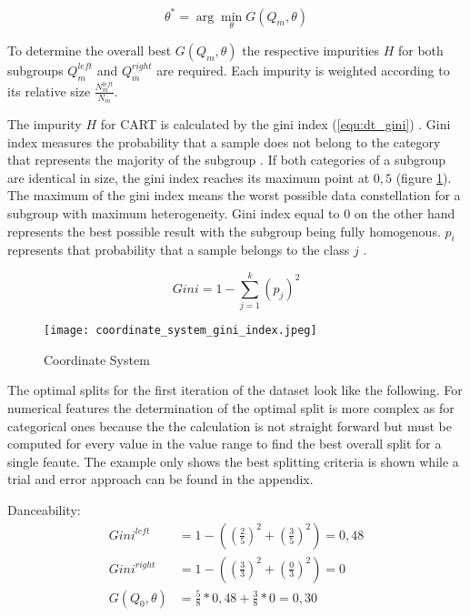 \begin{equation}
    \theta ^* = \arg \min_{\theta}  G(Q_{m}, \theta)
    \label{equ:dt_min_gain}
\end{equation}

To determine the overall best \(G(Q_{m}, \theta)\) the respective impurities \(H\) for both subgroups \(Q^{left}_{m}\) 
and \(Q^{right}_{m}\) are required. Each impurity is weighted according to its relative size 
\(\frac{N^{left}_{m}}{N_{m}}\).

The impurity \(H\) for \ac{CART} is calculated by the gini index (\ref{equ:dt_gini}) \cite[p.613f]{tangirala2020evaluating}. Gini index measures the probability that a sample 
does not belong to the category that represents the majority of the subgroup \cite[p.335]{James2021}. If both 
categories of a subgroup are identical in size, the gini index reaches its maximum point at \(0,5\) (figure \ref{fig:coordinate_system_initial_dataset}). The 
maximum of the gini index means the worst possible data constellation for a subgroup with maximum heterogeneity. 
Gini index equal to \(0\) on the other hand represents the best possible result with the subgroup being fully 
homogenous. \(p_{i}\) represents that probability that a sample belongs to the class \(j\) \cite[p.335]{James2021}.

\begin{equation}
    Gini = 1 - \sum ^k_{j = 1}(p_{j})^2
    \label{equ:dt_gini}
\end{equation}

\begin{figure}[H]
    \centering
    \caption[]{Coordinate System}
	\label{fig:coordinate_system_initial_dataset}
    \texttt{[image: coordinate\_system\_gini\_index.jpeg]}
\end{figure}

The optimal splits for the first iteration of the dataset look like the following. For numerical features the determination of 
the optimal split is more complex as for categorical ones because the the calculation is not straight forward but must be computed
for every value in the value range to find the best overall split for a single feaute. The example only shows the best splitting
criteria is shown while a trial and error approach can be found in the appendix. 

Danceability: 
\begin{equation*}
    \begin{aligned}
        Gini^{left} &= 1 - ((\frac{2}{5})^2 + (\frac{3}{5})^2) = 0,48 
        \\
        Gini^{right}  &= 1 - ((\frac{3}{3})^2 + (\frac{0}{3})^2) = 0 
        \\
        G(Q_{0},\theta) &= \frac{5}{8} * 0,48 + \frac{3}{8} * 0 = 0,30
    \end{aligned}
\end{equation*}

